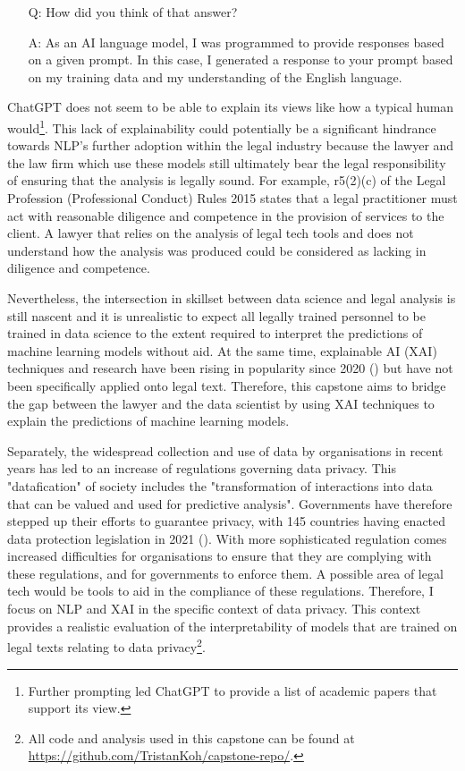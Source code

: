 \begin{itemize}
  \item[Q:] How did you think of that answer?
  \item[A:] As an AI language model, I was programmed to provide responses based on a given prompt. In this case, I generated a response to your prompt based on my training data and my understanding of the English language.
\end{itemize}

ChatGPT does not seem to be able to explain its views like how a typical human would\footnote{Further prompting led ChatGPT to provide a list of academic papers that support its view.}. This lack of explainability could potentially be a significant hindrance towards NLP's further adoption within the legal industry because the lawyer and the law firm which use these models still ultimately bear the legal responsibility of ensuring that the analysis is legally sound. For example, r5(2)(c) of the Legal Profession (Professional Conduct) Rules 2015 states that a legal practitioner must act with reasonable diligence and competence in the provision of services to the client. A lawyer that relies on the analysis of legal tech tools and does not understand how the analysis was produced could be considered as lacking in diligence and competence.

Nevertheless, the intersection in skillset between data science and legal analysis is still nascent and it is unrealistic to expect all legally trained personnel to be trained in data science to the extent required to interpret the predictions of machine learning models without aid. At the same time, explainable AI (XAI) techniques and research have been rising in popularity since 2020 (\cite{linardatos2020}) but have not been specifically applied onto legal text. Therefore, this capstone aims to bridge the gap between the lawyer and the data scientist by using XAI techniques to explain the predictions of machine learning models. 

Separately, the widespread collection and use of data by organisations in recent years has led to an increase of regulations governing data privacy. This "datafication" of society includes the "transformation of interactions into data that can be valued and used for predictive analysis". Governments have therefore stepped up their efforts to guarantee privacy, with 145 countries having enacted data protection legislation in 2021 (\cite{gstrein2022}). With more sophisticated regulation comes increased difficulties for organisations to ensure that they are complying with these regulations, and for governments to enforce them. A possible area of legal tech would be tools to aid in the compliance of these regulations. Therefore, I focus on NLP and XAI in the specific context of data privacy. This context provides a realistic evaluation of the interpretability of models that are trained on legal texts relating to data privacy\footnote{All code and analysis used in this capstone can be found at \url{https://github.com/TristanKoh/capstone-repo/}.}.

